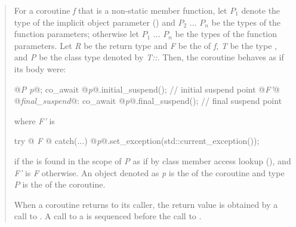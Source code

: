 \begin{quote}
\pnum
For a coroutine \textit{f} that is a non-static member function, let $P_1$ denote the type of the implicit object parameter () and $P_2$ ... $P_n$ be the types of the function parameters; otherwise let $P_1$ ... $P_n$ be the types of the function parameters.
Let \textit{R} be the return type and \textit{F} be the 
of \textit{f}, \textit{T} be the type , and \textit{P} be the class type denoted by \textit{T::}. 
Then, the coroutine behaves as if its body were:
\begin{codeblock}
  {
     @\textit{P p}@;
     co_await @\textit{p}@.initial_suspend(); // initial suspend point
     @\textit{F'}@
  @\textit{final_suspend}@:
     co_await @\textit{p}@.final_suspend(); // final suspend point
  }
\end{codeblock}
where \textit{F'} is 
\begin{codeblock}
	try {@\textit{ F }@} catch(...) { @\textit{p}@.set_exception(std::current_exception()); }
\end{codeblock}
if the   is found in the scope of \textit{P}
as if by class member access lookup (), and \textit{F'} is \textit{F} otherwise.
An object denoted as \textit{p} is the  of
the coroutine and type $P$ is the 
of the coroutine.


\pnum
When a coroutine returns to its caller, the return value is obtained by a call to . A call to a  is sequenced before the call to .



\end{quote}
